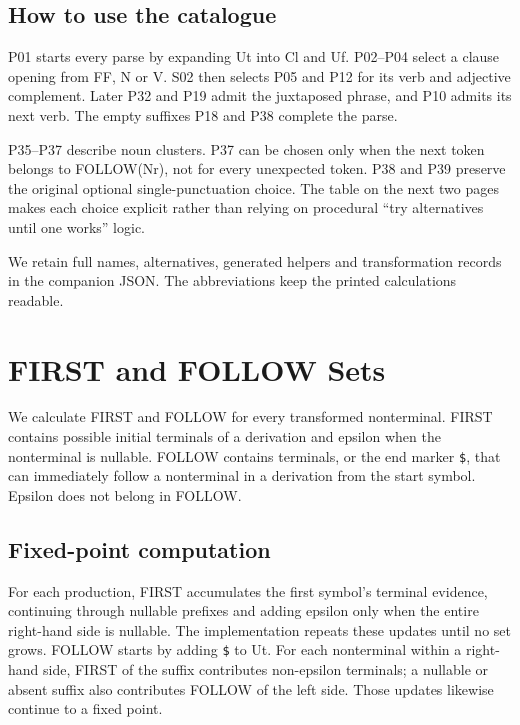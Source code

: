 \documentclass[11pt]{article}
\newcommand{\code}[1]{\texttt{#1}}
\begin{document}
{\small\renewcommand{\arraystretch}{1.15}}

\subsection*{How to use the catalogue}
P01 starts every parse by expanding Ut into Cl and Uf. P02--P04 select a
clause opening from FF, N or V. S02 then selects P05 and P12 for its verb and
adjective complement. Later P32 and P19 admit the juxtaposed phrase, and
P10 admits its next verb. The empty suffixes P18 and P38 complete the parse.

P35--P37 describe noun clusters. P37 can be chosen only when the next token
belongs to FOLLOW(Nr), not for every unexpected token. P38 and P39 preserve
the original optional single-punctuation choice. The table on the next two
pages makes each choice explicit rather than relying on procedural
``try alternatives until one works'' logic.

We retain full names, alternatives, generated helpers and transformation
records in the companion JSON. The abbreviations keep the printed
calculations readable.

\clearpage
\section{FIRST and FOLLOW Sets}
We calculate FIRST and FOLLOW for every transformed nonterminal.
FIRST contains possible initial terminals of a derivation and epsilon when
the nonterminal is nullable. FOLLOW contains terminals, or the end marker
\code{\$}, that can immediately follow a nonterminal in a derivation from the
start symbol. Epsilon does not belong in FOLLOW.

{\small\renewcommand{\arraystretch}{1.25}}

\subsection*{Fixed-point computation}
For each production, FIRST accumulates the first symbol's terminal evidence,
continuing through nullable prefixes and adding epsilon only when the entire
right-hand side is nullable. The implementation repeats these updates until
no set grows. FOLLOW starts by adding \code{\$} to Ut. For each nonterminal
within a right-hand side, FIRST of the suffix contributes non-epsilon
terminals; a nullable or absent suffix also contributes FOLLOW of the left
side. Those updates likewise continue to a fixed point.
\end{document}
